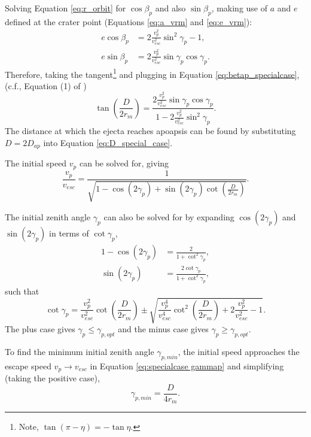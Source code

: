 \documentclass{article}
\begin{document}
Solving Equation \eqref{eq:r_orbit} for $\cos\beta_p$ and also $\sin\beta_p$, making use of $a$ and $e$ defined at the crater point (Equations \eqref{eq:a_vrm} and \eqref{eq:e_vrm}):
\begin{align}\label{eq:ecosbetap}
e\cos\beta_p &= 2\frac{v_p^2}{v_{esc}^2}\sin^2\gamma_p - 1,\\
e\sin\beta_p &= 2\frac{v_p^2}{v_{esc}^2}\sin\gamma_p\cos\gamma_p.\label{eq:esinbetap}
\end{align}
Therefore, taking the tangent\footnote{Note, $\tan(\pi-\eta) = -\tan\eta$.} and plugging in Equation \eqref{eq:betap_specialcase}, (c.f., Equation (1) of \cite{vickery1986size})
\begin{equation}\label{eq:D_special_case}
\tan\left(\frac{D}{2r_m}\right) = \frac{2\frac{v_p^2}{v_{esc}^2}\sin\gamma_p\cos\gamma_p}{1 - 2\frac{v_p^2}{v_{esc}^2}\sin^2\gamma_p}.
\end{equation}
The distance at which the ejecta reaches apoapsis can be found by substituting $D = 2D_{ap}$ into Equation \eqref{eq:D_special_case}.

The initial speed $v_p$ can be solved for, giving
\begin{equation}\label{eq:vp_special_case}
\frac{v_p}{v_{esc}} = \frac{1}{\sqrt{1-\cos(2\gamma_p) + \sin(2\gamma_p)\cot\left(\frac{D}{2r_m}\right)}}.
\end{equation}

The initial zenith angle $\gamma_p$ can also be solved for by expanding $\cos(2\gamma_p)$ and $\sin(2\gamma_p)$ in terms of $\cot\gamma_p$,
\begin{align}\label{eq:1-cos 2g to cot g}
1-\cos(2\gamma_p) &= \frac{2}{1+\cot^2\gamma_p},\\\label{eq:sin 2g to cot g}
\sin(2\gamma_p) &= \frac{2\cot\gamma_p}{1+\cot^2\gamma_p},
\end{align}
such that
\begin{equation}\label{eq:specialcase gammap}
\cot\gamma_p = \frac{v_p^2}{v_{esc}^2}\cot\left(\frac{D}{2r_m}\right) \pm \sqrt{\frac{v_p^4}{v_{esc}^4}\cot^2\left(\frac{D}{2r_m}\right) + 2\frac{v_p^2}{v_{esc}^2}-1}.
\end{equation}
The plus case gives $\gamma_p \le \gamma_{p,opt}$ and the minus case gives  $\gamma_p \ge \gamma_{p,opt}$.

To find the minimum initial zenith angle $\gamma_{p,min}$, the initial speed approaches the escape speed $v_p\to v_{esc}$ in Equation \eqref{eq:specialcase gammap} and simplifying (taking the positive case),
\begin{equation}\label{eq:gpmin_special}
\gamma_{p,min} = \frac{D}{4r_m}.
\end{equation}
\end{document}

